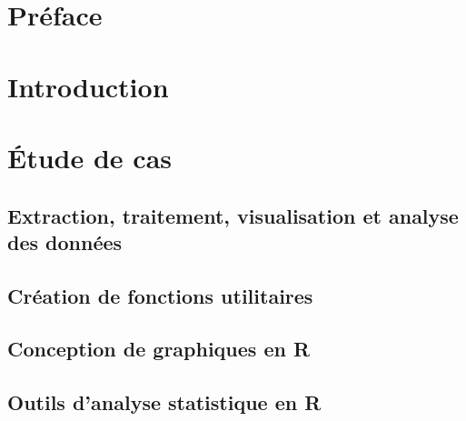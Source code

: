 \documentclass{report}
\newcommand*{\titlePage}{
	\begingroup 
		\hbox{
			\hspace*{0.1\textwidth}
			\rule{1.5pt}{\textheight}
			\hspace*{0.05\textwidth}
			\parbox[b]{0.75\textwidth}{
				{\noindent\LARGE\bfseries Étude de cas:} \\[\baselineskip]
				{\noindent\Huge\bfseries Analyse de marché du} \\
				{\noindent\Huge\bfseries transport aérien} \\
				{\noindent\Huge\bfseries canadien avec R} \\[2\baselineskip]
				{\large\textit{Atelier d'introduction à R}}\\[4\baselineskip]
				{\Large\textsc{Cabral Cruz, Samuel}} \\[2\baselineskip]
				{\large \normalfont{Avec la collaboration de}} \\[\baselineskip]
				{\large\textsc{Beauchemin, David}} \\[\baselineskip]
				{\large\textsc{Goulet, Vincent}} \\[4\baselineskip]
				{\large {Dans le cadre du colloque R à Québec}} \\[\baselineskip]
				{\large {25 mai 2017}} 
				\vspace{0.35\textheight}}}\endgroup}
\begin{document}
\renewcommand{\labelitemi}{\tiny $\blacktriangleright$}
\renewcommand{\labelitemii}{\footnotesize $\bullet$}
\renewcommand{\labelitemiii}{\tiny \ding{117}}
\renewcommand{\labelitemiv}{\small $\star$}

\begin{titlepage}
	\clearpage\thispagestyle{empty}
	\titlePage
\end{titlepage}
\newpage

\tableofcontents
\listoffigures
{}
\lstlistoflistings
{}
\listoftables
{}
\chapter*{Préface}
	

\chapter*{Introduction}
\setcounter{chapter}{1}
	

\chapter*{Étude de cas}
	
\section{Extraction, traitement, visualisation et analyse des données}
	

\newpage
\section{Création de fonctions utilitaires}
	
	\label{sec:fctUtil}

\newpage
\section{Conception de graphiques en R}
	

\section{Outils d'analyse statistique en R}
	
	\label{sec:statsTools}
\end{document}
